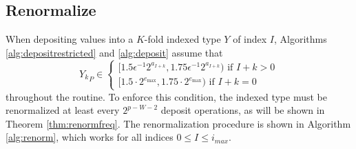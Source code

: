 \subsection{Renormalize}
    \label{sec:primitiveops_renormalize}
    When depositing values into a $K$-fold indexed type $Y$ of index $I$,
    Algorithms \ref{alg:depositrestricted} and \ref{alg:deposit}
    assume that 
    \[
      {Y_k}_P \in \begin{cases}[1.5  \epsilon^{-1} 2^{a_{I + k}}, 1.75  \epsilon^{-1} 2^{a_{I + k}}) \text{ if } I + k > 0 \\ [1.5 \cdot 2^{e_{\max}}, 1.75 \cdot 2^{e_{\max}}) \text{ if } I + k = 0\end{cases}
    \] 
    throughout the routine.
    To enforce this condition, the indexed type must be renormalized at least
    every $2^{p-W-2}$ deposit operations, as will be shown in Theorem \ref{thm:renormfreq}.
    The renormalization procedure is shown in Algorithm \ref{alg:renorm},
    which works for all indices $0 \leq I \leq i_{max}$.

